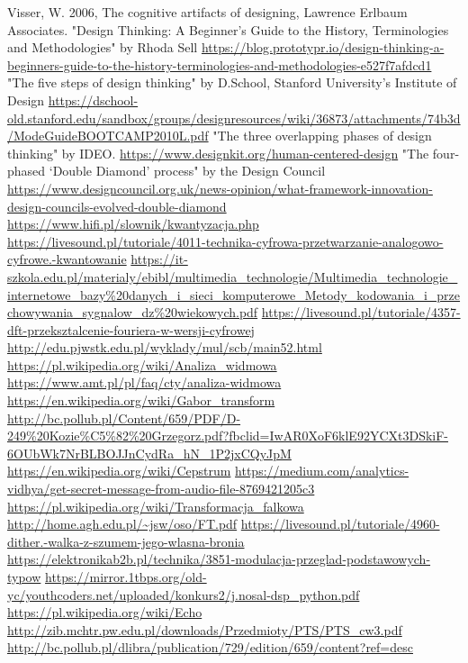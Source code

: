 \documentclass[a4paper,titleauthor]{mwart}
\begin{document}
	
	
	
	
	\begin{thebibliography}{SYCYfProjekt}
		Visser, W. 2006, The cognitive artifacts of designing, Lawrence Erlbaum Associates.
		"Design Thinking: A Beginner’s Guide to the History, Terminologies and Methodologies" by Rhoda Sell \url{https://blog.prototypr.io/design-thinking-a-beginners-guide-to-the-history-terminologies-and-methodologies-e527f7afdcd1}
		"The five steps of design thinking" by D.School, Stanford University’s Institute of Design \url{https://dschool-old.stanford.edu/sandbox/groups/designresources/wiki/36873/attachments/74b3d/ModeGuideBOOTCAMP2010L.pdf}
		"The three overlapping phases of design thinking" by IDEO. \url{https://www.designkit.org/human-centered-design}
		"The four-phased ‘Double Diamond’ process" by the Design Council \url{https://www.designcouncil.org.uk/news-opinion/what-framework-innovation-design-councils-evolved-double-diamond}
		\url{https://www.hifi.pl/slownik/kwantyzacja.php}
		\url{https://livesound.pl/tutoriale/4011-technika-cyfrowa-przetwarzanie-analogowo-cyfrowe.-kwantowanie}
		\url{https://it-szkola.edu.pl/materialy/ebibl/multimedia_technologie/Multimedia_technologie_internetowe_bazy%20danych_i_sieci_komputerowe_Metody_kodowania_i_przechowywania_sygnalow_dz%20wiekowych.pdf}
			\url{https://livesound.pl/tutoriale/4357-dft-przeksztalcenie-fouriera-w-wersji-cyfrowej}
			\url{http://edu.pjwstk.edu.pl/wyklady/mul/scb/main52.html}
			\url{https://pl.wikipedia.org/wiki/Analiza_widmowa}
			\url{https://www.amt.pl/pl/faq/cty/analiza-widmowa}
			\url{https://en.wikipedia.org/wiki/Gabor_transform}
			\url{http://bc.pollub.pl/Content/659/PDF/D-249%20Kozie%C5%82%20Grzegorz.pdf?fbclid=IwAR0XoF6klE92YCXt3DSkiF-6OUbWk7NrBLBOJJnCydRa_hN_1P2jxCQyJpM}
				\url{https://en.wikipedia.org/wiki/Cepstrum}
				\url{https://medium.com/analytics-vidhya/get-secret-message-from-audio-file-8769421205c3}
				\url{https://pl.wikipedia.org/wiki/Transformacja_falkowa}
				\url{http://home.agh.edu.pl/~jsw/oso/FT.pdf}
				\url{https://livesound.pl/tutoriale/4960-dither.-walka-z-szumem-jego-wlasna-bronia}
				\url{https://elektronikab2b.pl/technika/3851-modulacja-przeglad-podstawowych-typow}
				\url{https://mirror.1tbps.org/old-yc/youthcoders.net/uploaded/konkurs2/j.nosal-dsp_python.pdf}
				\url{https://pl.wikipedia.org/wiki/Echo}
				\url{http://zib.mchtr.pw.edu.pl/downloads/Przedmioty/PTS/PTS_cw3.pdf}
				\url{http://bc.pollub.pl/dlibra/publication/729/edition/659/content?ref=desc}
			\end{thebibliography}
			
		
\end{document}
